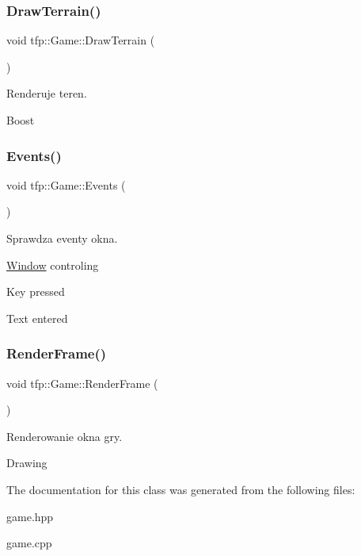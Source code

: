 \subsubsection{\texorpdfstring{Draw\+Terrain()}{DrawTerrain()}}
{\footnotesize\ttfamily void tfp\+::\+Game\+::\+Draw\+Terrain (\begin{DoxyParamCaption}{ }\end{DoxyParamCaption})}



Renderuje teren. 

Boost \mbox{\label{classtfp_1_1_game_ace5f19e68b37a3fc6be123a94ee898c7}} 
\subsubsection{\texorpdfstring{Events()}{Events()}}
{\footnotesize\ttfamily void tfp\+::\+Game\+::\+Events (\begin{DoxyParamCaption}{ }\end{DoxyParamCaption})}



Sprawdza eventy okna. 

\mbox{\hyperlink{classtfp_1_1_window}{Window}} controling

Key pressed

Text entered \mbox{\label{classtfp_1_1_game_ae5554bf120f7ee523be08ea14efe6be2}} 
\subsubsection{\texorpdfstring{Render\+Frame()}{RenderFrame()}}
{\footnotesize\ttfamily void tfp\+::\+Game\+::\+Render\+Frame (\begin{DoxyParamCaption}{ }\end{DoxyParamCaption})}



Renderowanie okna gry. 

Drawing 

The documentation for this class was generated from the following files\+:\begin{DoxyCompactItemize}
\item 
game.\+hpp\item 
game.\+cpp\end{DoxyCompactItemize}
